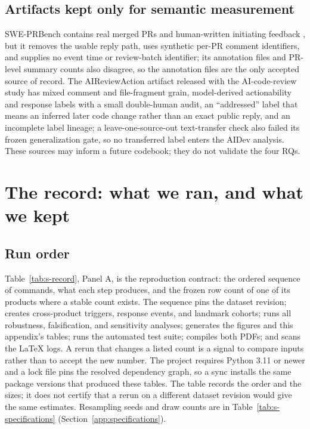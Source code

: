 \documentclass[pdflatex,sn-basic]{sn-jnl}
\begin{document}
\subsection{Artifacts kept only for semantic measurement}\label{app:semantic-sources}

SWE-PRBench contains real merged PRs and human-written initiating feedback
\citep{kumar2026sweprbench}, but it removes the usable reply path, uses
synthetic per-PR comment identifiers, and supplies no event time or review-batch
identifier; its annotation files and PR-level summary counts also disagree, so
the annotation files are the only accepted source of record. The AIReviewAction artifact released with the AI-code-review study
\citep{sun2026aicodereview} has
mixed comment and file-fragment grain, model-derived actionability and response
labels with a small double-human audit, an ``addressed'' label that means an
inferred later code change rather than an exact public reply, and an incomplete
label lineage; a leave-one-source-out text-transfer check also failed its frozen
generalization gate, so no transferred label enters the AIDev analysis. These
sources may inform a future codebook; they do not validate the four RQs.



\section{The record: what we ran, and what we kept}\label{app:reproduction}

\subsection{Run order}\label{app:runorder}

Table~\ref{tab:s-record}, Panel A, is the reproduction contract: the ordered
sequence of commands, what each step produces, and the frozen row count of one
of its products where a stable count exists. The sequence pins the dataset
revision; creates cross-product triggers, response events, and landmark cohorts;
runs all robustness, falsification, and sensitivity analyses; generates the
figures and this appendix's tables; runs the automated test suite; compiles both
PDFs; and scans the LaTeX logs. A rerun that changes a listed count is a signal
to compare inputs rather than to accept the new number. The project requires
Python 3.11 or newer and a lock file pins the resolved dependency graph, so a
sync installs the same package versions that produced these tables. The table
records the order and the sizes; it does not certify that a rerun on a different
dataset revision would give the same estimates. Resampling seeds and draw counts
are in Table~\ref{tab:s-specifications} (Section~\ref{app:specifications}).
\end{document}
